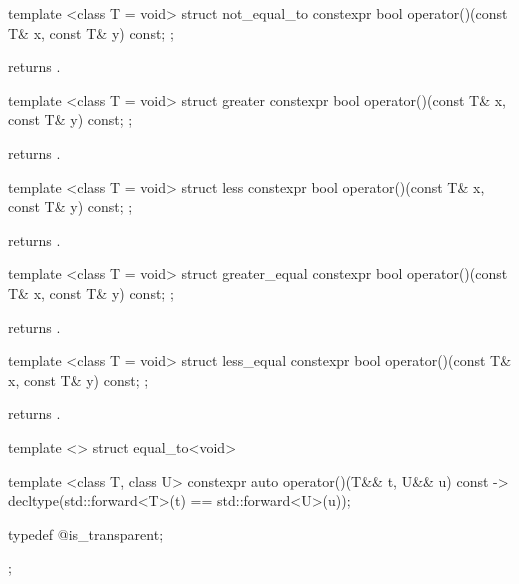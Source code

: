 %
\begin{itemdecl}
template <class T = void> struct not_equal_to {
  constexpr bool operator()(const T& x, const T& y) const;
};
\end{itemdecl}

\begin{itemdescr}
\pnum
{} returns .
\end{itemdescr}

%
\begin{itemdecl}
template <class T = void> struct greater {
  constexpr bool operator()(const T& x, const T& y) const;
};
\end{itemdecl}

\begin{itemdescr}
\pnum
{} returns .
\end{itemdescr}

%
\begin{itemdecl}
template <class T = void> struct less {
  constexpr bool operator()(const T& x, const T& y) const;
};
\end{itemdecl}

\begin{itemdescr}
\pnum
{} returns .
\end{itemdescr}

%
\begin{itemdecl}
template <class T = void> struct greater_equal {
  constexpr bool operator()(const T& x, const T& y) const;
};
\end{itemdecl}

\begin{itemdescr}
\pnum
{} returns .
\end{itemdescr}

%
\begin{itemdecl}
template <class T = void> struct less_equal {
  constexpr bool operator()(const T& x, const T& y) const;
};
\end{itemdecl}

\begin{itemdescr}
\pnum
{} returns .
\end{itemdescr}

%
\begin{itemdecl}
template <> struct equal_to<void> {
  template <class T, class U> constexpr auto operator()(T&& t, U&& u) const
    -> decltype(std::forward<T>(t) == std::forward<U>(u));

  typedef @\unspec@ is_transparent;
};
\end{itemdecl}

